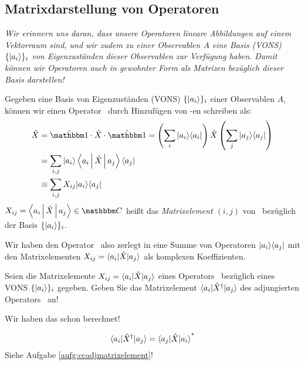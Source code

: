 \subsection{Matrixdarstellung von Operatoren}
\emph{Wir erinnern uns daran, dass unsere Operatoren lineare Abbildungen auf einem Vektorraum sind, und wir zudem zu einer Observablen $A$ eine Basis (VONS) $\{\ket{a_i}\}_i$ von Eigenzust\"anden dieser Observablen zur Verf\"ugung haben. Damit k\"onnen wir Operatoren auch in gewohnter Form als Matrizen bez\"uglich dieser Basis darstellen!}
\begin{defn}
 Gegeben eine Basis von Eigenzust\"anden (VONS)  $\{\ket{a_i}\}_i$ einer Observablen $A$, k\"onnen wir einen Operator \opx\ durch Hinzuf\"ugen von \opi-en schreiben als:
 \begin{align}
  \opx &= \opi \cdot  \opx \cdot \opi = \left(\opix{i}{a_i} \right) \opx \left(\opix{j}{a_j}\right) \\
  &= \sum_{i,j} \ket{a_i} \Braket{a_i | \opx | a_j} \bra{a_j} \\
  &\equiv \sum_{i,j} X_{ij} \ket{a_i}\bra{a_j}
 \end{align}
 $X_{ij} = \Braket{a_i | \opx | a_j} \in \comps$ hei\ss{}t das \emph{Matrixelement $(i,j)$} von \opx\ bez\"uglich der Basis $\{\ket{a_i}\}_i$.
\end{defn}
\begin{notiz}
 Wir haben den Operator \opx\ also zerlegt in eine Summe von Operatoren $\ket{a_i}\bra{a_j}$ mit den Matrixelementen $X_{ij} = \braket{a_i | \opx | a_j}$ als komplexen Koeffizienten.
\end{notiz}
\begin{aufg}
 Seien die Matrixelemente $X_{ij} = \braket{a_i | \opx | a_j}$ eines Operators \opx\ bez\"uglich eines VONS $\{\ket{a_i}\}_i$ gegeben. Geben Sie das Matrixelement $\braket{a_i | \opxh | a_j}$ des adjungierten Operators \opxh\ an!
\end{aufg}
\begin{tipp}
 Wir haben das schon berechnet!
\end{tipp}
\begin{loes}
 \begin{equation}
  \braket{a_i | \opxh | a_j} = \cc{\braket{a_j | \opx | a_i}}
 \end{equation}
 Siehe Aufgabe \ref{aufg:ccadjmatrixelement}! \qedsymbol
\end{loes}


